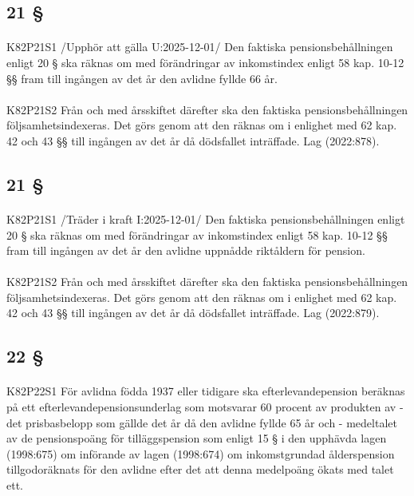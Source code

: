 \documentclass[a4paper,notitlepage,openany,10pt]{book}
\begin{document}
\subsection*{21 §}
\paragraph*{}
{\tiny K82P21S1}
/Upphör att gälla U:2025-12-01/
Den faktiska pensionsbehållningen enligt 20 § ska räknas om med förändringar av inkomstindex enligt 58 kap. 10-12 §§ fram till ingången av det år den avlidne fyllde 66 år.
\paragraph*{}
{\tiny K82P21S2}
Från och med årsskiftet därefter ska den faktiska pensionsbehållningen följsamhetsindexeras. Det görs genom att den räknas om i enlighet med 62 kap. 42 och 43 §§ till ingången av det år då dödsfallet inträffade.
Lag (2022:878).
\subsection*{21 §}
\paragraph*{}
{\tiny K82P21S1}
/Träder i kraft I:2025-12-01/
Den faktiska pensionsbehållningen enligt 20 § ska räknas om med förändringar av inkomstindex enligt 58 kap. 10-12 §§ fram till ingången av det år den avlidne uppnådde riktåldern för pension.
\paragraph*{}
{\tiny K82P21S2}
Från och med årsskiftet därefter ska den faktiska pensionsbehållningen följsamhetsindexeras. Det görs genom att den räknas om i enlighet med 62 kap. 42 och 43 §§ till ingången av det år då dödsfallet inträffade.
Lag (2022:879).
\subsection*{22 §}
\paragraph*{}
{\tiny K82P22S1}
För avlidna födda 1937 eller tidigare ska efterlevandepension beräknas på ett efterlevandepensionsunderlag som motsvarar 60 procent av produkten av
\newline - det prisbasbelopp som gällde det år då den avlidne fyllde 65 år och
\newline - medeltalet av de pensionspoäng för tilläggspension som enligt 15 § i den upphävda lagen (1998:675) om införande av lagen (1998:674) om inkomstgrundad ålderspension tillgodoräknats för den avlidne efter det att denna medelpoäng ökats med talet ett.
\end{document}
